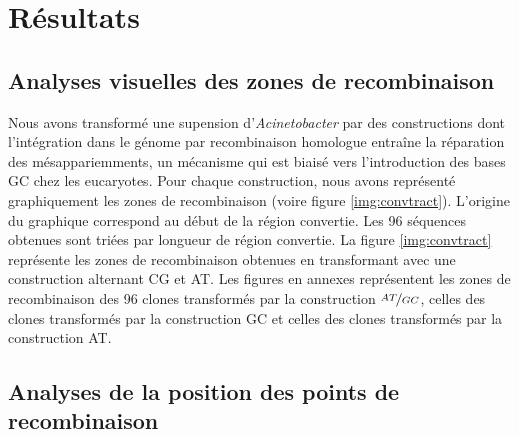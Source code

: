 

\section{Résultats}
\label{sec:resultats}

\subsection{Analyses visuelles des zones de recombinaison}
\label{subsec:visu}

Nous avons transformé une supension d'\emph{Acinetobacter} par des constructions
dont l'intégration dans le génome par recombinaison homologue entraîne la
réparation des mésappariemments, un mécanisme qui est biaisé vers l'introduction
des bases GC chez les eucaryotes. Pour chaque construction, nous avons
représenté graphiquement les zones de recombinaison (voire figure
\ref{img:convtract}). L'origine du graphique correspond au début de la région
convertie. Les 96 séquences obtenues sont triées par longueur de région
convertie. La figure \ref{img:convtract} représente les zones de recombinaison
obtenues en transformant avec une construction alternant CG et AT. Les figures
en annexes
représentent les zones de recombinaison des 96 clones transformés par la
construction \(\nicefrac{AT}{GC}\), celles des clones transformés par la
construction GC et celles des clones transformés par la construction AT.

\subsection{Analyses de la position des points de recombinaison}



\lipsum[1]

